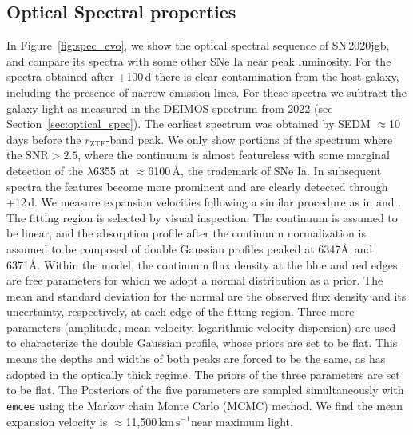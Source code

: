 \documentclass[twocolumn]{aastex631}
\newcommand{\sn}{SN\,2020jgb}
\newcommand{\kms}{$\mathrm{km}\,\mathrm{s}^{-1}$}
\begin{document}
\subsection{Optical Spectral properties}
In Figure~\ref{fig:spec_evo}, we show the optical spectral sequence of \sn, and compare its spectra with some other SNe Ia near peak luminosity. For the spectra obtained after +100\,d there is clear contamination from the host-galaxy, including the presence of narrow emission lines. For these spectra we subtract the galaxy light as measured in the DEIMOS spectrum from 2022 (see Section~\ref{sec:optical_spec}). The earliest spectrum was obtained by SEDM $\approx$10\,days before the $r_\mathrm{ZTF}$-band peak. We only show portions of the spectrum where the $\mathrm{SNR}>2.5$, where the continuum is almost featureless with some marginal detection of the  $\lambda$6355 at $\approx$6100\,\r{A}, the trademark of SNe Ia. In subsequent spectra the  features become more prominent and are clearly detected through +12\,d. We measure  expansion velocities following a similar procedure as in \citet{Childress_2013,Childress_2014} and \citet{Maguire_2014}. The fitting region is selected by visual inspection. The continuum is assumed to be linear, and the absorption profile after the continuum normalization is assumed to be composed of double Gaussian profiles peaked at 6347\AA\ and 6371\AA. Within the model, the continuum flux density at the blue and red edges are free parameters for which we adopt a normal distribution as a prior. The mean and standard deviation for the normal are the observed flux density and its uncertainty, respectively, at each edge of the fitting region. Three more parameters (amplitude, mean velocity, logarithmic velocity dispersion) are used to characterize the double Gaussian profile, whose priors are set to be flat. This means the depths and widths of both peaks are forced to be the same, as \citet{Maguire_2014} has adopted in the optically thick regime. The priors of the three parameters are set to be flat. The Posteriors of the five parameters are sampled simultaneously with \texttt{emcee} \citep{emcee_2013} using the Markov chain Monte Carlo (MCMC) method. We find the mean expansion velocity is $\approx$11,500\,\kms near maximum light.
\end{document}

